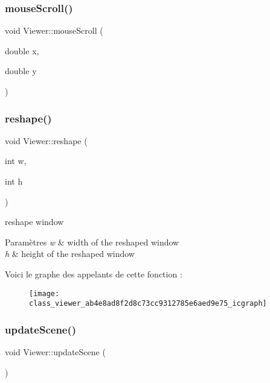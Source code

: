 \subsubsection{\texorpdfstring{mouse\+Scroll()}{mouseScroll()}}
{\footnotesize\ttfamily void Viewer\+::mouse\+Scroll (\begin{DoxyParamCaption}\item[{double}]{x,  }\item[{double}]{y }\end{DoxyParamCaption})}

\mbox{\label{class_viewer_ab4e8ad8f2d8c73cc9312785e6aed9e75}} 
\subsubsection{\texorpdfstring{reshape()}{reshape()}}
{\footnotesize\ttfamily void Viewer\+::reshape (\begin{DoxyParamCaption}\item[{int}]{w,  }\item[{int}]{h }\end{DoxyParamCaption})}



reshape window 


\begin{DoxyParams}{Paramètres}
{\em w} & width of the reshaped window \\
\hline
{\em h} & height of the reshaped window \\
\hline
\end{DoxyParams}
Voici le graphe des appelants de cette fonction \+:\nopagebreak
\begin{figure}[H]
\begin{center}
\leavevmode
\texttt{[image: class\_viewer\_ab4e8ad8f2d8c73cc9312785e6aed9e75\_icgraph]}
\end{center}
\end{figure}
\mbox{\label{class_viewer_a7deac2bd87e6c5a76c6eb600306d6096}} 
\subsubsection{\texorpdfstring{update\+Scene()}{updateScene()}}
{\footnotesize\ttfamily void Viewer\+::update\+Scene (\begin{DoxyParamCaption}{ }\end{DoxyParamCaption})}



